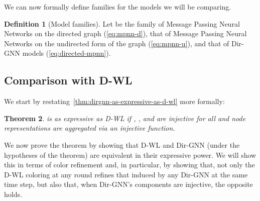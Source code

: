 \documentclass{article}
\newcommand\oursacro{Dir-GNN}
\theoremstyle{plain}
\newtheorem{theorem}{Theorem}[section]
\theoremstyle{definition}
\newtheorem{definition}[theorem]{Definition}
\theoremstyle{remark}
\begin{document}
We can now formally define families for the models we will be comparing.

\begin{definition}[Model families] \label{def:model_families}
    Let  be the family of Message Passing Neural Networks on the directed graph (\cref{eq:mpnn-d}),  that of Message Passing Neural Networks on the undirected form of the graph (\cref{eq:mpnn-u}), and  that of \oursacro{} models (\cref{eq:directed-mpnn}).
\end{definition}

\subsection{Comparison with D-WL} \label{app:d-wl-proof}

We start by restating~\cref{thm:dirgnn-as-expressive-as-d-wl} more formally:

\begin{theorem}\label{thm:dirgnn-as-expressive-as-d-wl-formal}
     is as expressive as D-WL if , , and  are injective for all  and node representations are aggregated via an injective  function. 
\end{theorem}

We now prove the theorem by showing that D-WL and \oursacro{} (under the hypotheses of the theorem) are equivalent in their expressive power. We will show this in terms of color refinement and, in particular, by showing that, not only the D-WL coloring at any round  refines that induced by any \oursacro{} at the same time step, but also that, when \oursacro{}'s components are injective, the opposite holds.
\end{document}
